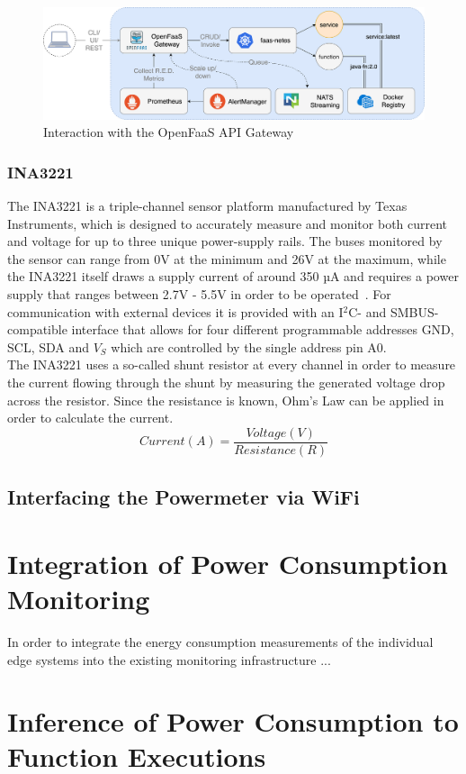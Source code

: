 \begin{figure}[h]
    \centering
    \includegraphics[width=1\textwidth]{./figures/of-workflow.png}
    \caption{Interaction with the OpenFaaS API Gateway~\parencite{openfaas-stack}}
    \label{fig:openfaas-gateway}
\end{figure}

\subsubsection{INA3221}
The INA3221 is a triple-channel sensor platform manufactured by Texas Instruments, which is designed to accurately measure and monitor both current and voltage for up to three unique power-supply rails. The buses monitored by the sensor can range from 0V at the minimum and 26V at the maximum, while the INA3221 itself draws a supply current of around 350 µA and requires a power supply that ranges between 2.7V - 5.5V in order to be operated~\parencite{ina3221-manual}. For communication with external devices it is provided with an I$^{2}$C- and SMBUS-compatible interface that allows for four different programmable addresses GND, SCL, SDA and $V_{S}$ which are controlled by the single address pin A0.\\
The INA3221 uses a so-called shunt resistor at every channel in order to measure the current flowing through the shunt by measuring the generated voltage drop across the resistor. Since the resistance is known, Ohm's Law can be applied in order to calculate the current.\\

\begin{equation}
   Current (A) = \frac{Voltage (V)}{Resistance (R)}
\end{equation}

\subsection{Interfacing the Powermeter via WiFi}


\section{Integration of Power Consumption Monitoring}
In order to integrate the energy consumption measurements of the individual edge systems into the existing monitoring infrastructure ...

\section{Inference of Power Consumption to Function Executions}